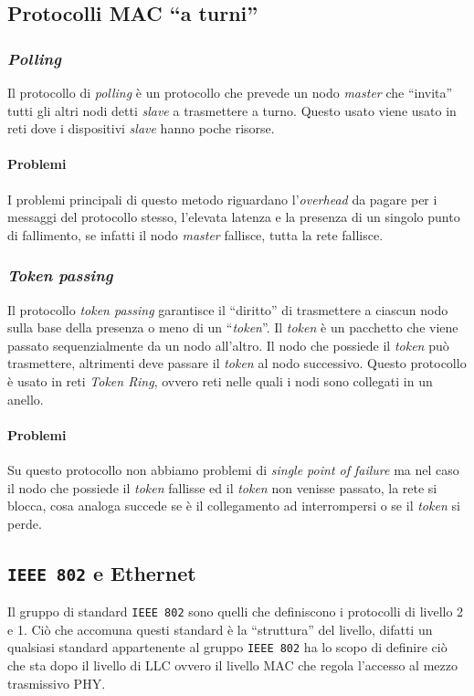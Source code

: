    \subsection[Protocolli \texttt{MAC} ``a turni'']{Protocolli \Acrshort*{MAC} ``a turni''}
        \subsubsection{\textit{Polling}}
            Il protocollo di \textit{polling} è un protocollo che prevede un nodo \textit{master} che ``invita'' tutti gli altri nodi detti \textit{slave} a trasmettere a turno. Questo usato viene usato in reti dove i dispositivi \textit{slave} hanno poche risorse.
            \paragraph{Problemi} I problemi principali di questo metodo riguardano l'\textit{overhead} da pagare per i messaggi del protocollo stesso, l'elevata latenza e la presenza di un singolo punto di fallimento, se infatti il nodo \textit{master} fallisce, tutta la rete fallisce.
        \subsubsection{\textit{Token passing}}
            Il protocollo \textit{token passing} garantisce il ``diritto'' di trasmettere a ciascun nodo sulla base della presenza o meno di un ``\textit{token}''. Il \textit{token} è un pacchetto che viene passato sequenzialmente da un nodo all'altro. Il nodo che possiede il \textit{token} può trasmettere, altrimenti deve passare il \textit{token} al nodo successivo. Questo protocollo è usato in reti \textit{Token Ring}, ovvero reti nelle quali i nodi sono collegati in un anello.
            \paragraph{Problemi} Su questo protocollo non abbiamo problemi di \textit{single point of failure} ma nel caso il nodo che possiede il \textit{token} fallisse ed il \textit{token} non venisse passato, la rete si blocca, cosa analoga succede se è il collegamento ad interrompersi o se il \textit{token} si perde.
    \subsection[\texttt{IEE 802} e Ethernet]{\texttt{\Acrshort*{IEEE} 802} e Ethernet}
        Il gruppo di standard \texttt{\Acrshort*{IEEE} 802} sono quelli che definiscono i protocolli di livello 2 e 1. Ciò che accomuna questi standard è la ``struttura'' del livello, difatti un qualsiasi standard appartenente al gruppo \texttt{\Acrshort*{IEEE} 802} ha lo scopo di definire ciò che sta dopo il livello di \acrfull*{LLC} ovvero il livello \acrfull*{MAC} che regola l'accesso al mezzo trasmissivo \acrfull*{PHY}.
